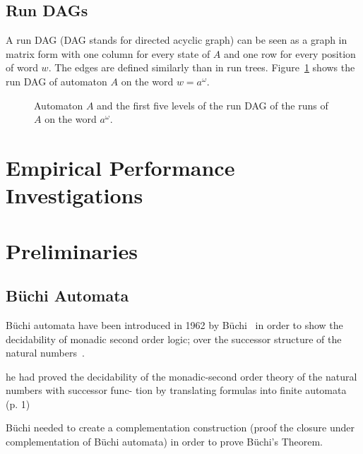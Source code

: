 \subsection{Run DAGs}
A run DAG (DAG stands for directed acyclic graph) can be seen as a graph in matrix form with one column for every state of $A$ and one row for every position of word $w$. The edges are defined similarly than in run trees. Figure~\ref{run_dag} shows the run DAG of automaton $A$ on the word $w = a^\omega$.

\begin{figure}
\begin{center}
\Automaton
\hfil
\RunDAG
\end{center}
\caption{Automaton $A$ and the first five levels of the run DAG of the runs of $A$ on the word $a^\omega$.}
\label{run_dag}
\end{figure} 






\section{Empirical Performance Investigations}

\section{Preliminaries}


\subsection{Büchi Automata}
Büchi automata have been introduced in 1962 by Büchi~\cite{buchi1960decision} in order to show the decidability of monadic second order logic; over the successor structure of the natural numbers~\cite{2012_breuers}.

he had proved the decidability of the monadic-second order theory of the natural numbers with successor func- tion by translating formulas into finite automata~\cite{vardi2007automata} (p. 1)


Büchi needed to create a complementation construction (proof the closure under complementation of Büchi automata) in order to prove Büchi's Theorem.

